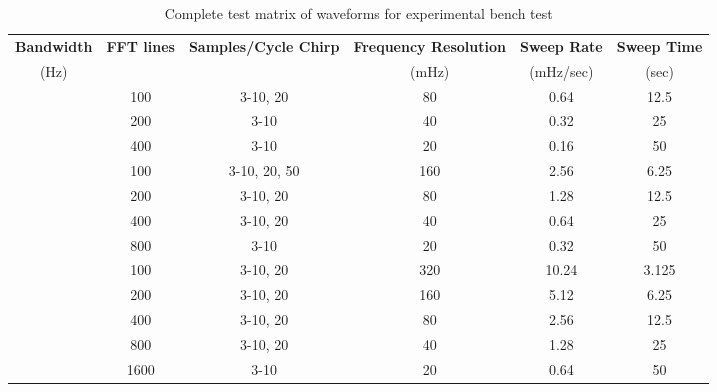 \begin{table}[ht] %
  \centering
  \scriptsize %
  \caption{Complete test matrix of waveforms for experimental bench test}
    \begin{tabular}{cccccc}
    \toprule %
    \textbf{Bandwidth} & \textbf{FFT lines} & \textbf{Samples/Cycle Chirp} & \textbf{Frequency Resolution} & \textbf{Sweep Rate} & \textbf{Sweep Time} \\
	(Hz) 	& 		&	 		& (mHz) & (mHz/sec)	& (sec) \\ \midrule
\multirow{4}[8]{.5in}{\centering8}
		& 100		& 3-10, 20 		& 80    	& 0.64		& 12.5 \\ \cmidrule (l){2-6} %
		& 200		& 3-10 	     		& 40
                                                                                                           & 0.32 		& 25 \\ \cmidrule (l){2-6}
		& 400   	& 3-10  		& 20   	& 0.16  	& 50 \\ \midrule
%
\multirow{5}[8]{.5in}{\centering16}
		& 100   	& 3-10, 20, 50      	& 160   & 2.56  	& 6.25 \\ \cmidrule (l){2-6}
		& 200   	& 3-10, 20		& 80    	& 1.28  	& 12.5 \\ \cmidrule (l){2-6}
		& 400   	& 3-10, 20     		& 40    	& 0.64  	& 25 \\ \cmidrule (l){2-6}
		& 800		& 3-10      		 & 20    & 0.32  	& 50 \\ \midrule
%
\multirow{6}[12]{.5in}{\centering32}
		& 100   	& 3-10, 20     		 & 320	& 10.24 	& 3.125 \\ \cmidrule (l){2-6}
		& 200   	& 3-10, 20      		& 160	& 5.12  	& 6.25 \\ \cmidrule (l){2-6}
		& 400   	& 3-10, 20      		& 80	& 2.56  	& 12.5 \\ \cmidrule (l){2-6}
		& 800   	& 3-10, 20      		& 40	& 1.28 	 	& 25 \\ \cmidrule (l){2-6}
		& 1600  	& 3-10       		& 20	& 0.64  	& 50 \\ \bottomrule %
    \end{tabular}
\label{tab:bench_test_matrix}
  \normalsize %
\end{table}
